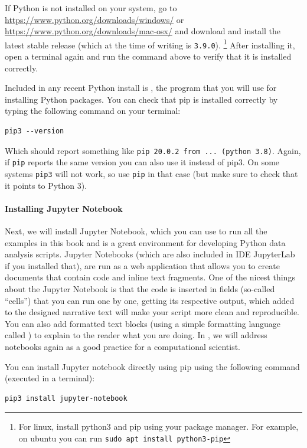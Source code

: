 If Python is not installed on your system, go to \url{https://www.python.org/downloads/windows/} or \url{https://www.python.org/downloads/mac-osx/} and download and install the latest stable release (which at the time of writing is \verb|3.9.0|).%
\footnote{For linux, install python3 and pip using your package manager. For example, on ubuntu you can run \texttt{sudo apt install python3-pip}}
After installing it, open a terminal again and run the command above to verify that it is installed correctly.

Included in any recent Python install is , the program that you will use for installing Python packages.
You can check that pip is installed correctly by typing the following command on your terminal:

\begin{verbatim}
pip3 --version
\end{verbatim}

Which should report something like \texttt{pip 20.0.2 from ... (python 3.8)}.
Again, if \verb|pip| reports the same version you can also use it instead of pip3.
On some systems \verb|pip3| will not work, so use \verb|pip| in that case
(but make sure to check that it points to Python 3).

\paragraph{Installing Jupyter Notebook}
Next, we will install Jupyter Notebook, which you can use to run all the examples in this book
and is a great environment for developing Python data analysis scripts.
Jupyter Notebooks (which are also included in IDE JupyterLab if you installed that), 
are run as a web application
that allows you to create documents that contain code and inline text fragments.
 One of the nicest things about 
the Jupyter Notebook is that the code is inserted in fields (so-called ``cells'') that you
can run one by one, getting its respective output, which added to the
designed narrative text will make your script more clean and
reproducible. You can also add formatted text blocks (using a simple formatting language called )
to explain to the reader what you are doing. In , we will address
notebooks again as a good practice for a computational scientist.

You can install Jupyter notebook directly using pip using the following command
(executed in a terminal):

\begin{verbatim}
pip3 install jupyter-notebook
\end{verbatim}

